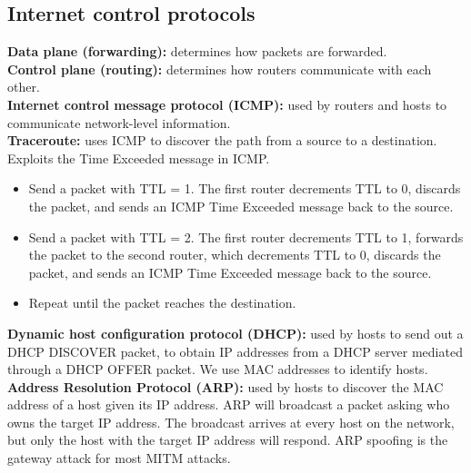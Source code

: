 \subsection{Internet control protocols}
\textbf{Data plane (forwarding):} determines how packets are forwarded.\\
\textbf{Control plane (routing):} determines how routers communicate with each other.\\
\textbf{Internet control message protocol (ICMP):} used by routers and hosts to communicate network-level information.\\
\textbf{Traceroute:} uses ICMP to discover the path from a source to a destination. Exploits the Time Exceeded message in ICMP.\\
\begin{itemize}
    \item Send a packet with TTL = 1. The first router decrements TTL to 0, discards the packet, and sends an ICMP Time Exceeded message back to the source.
    \item Send a packet with TTL = 2. The first router decrements TTL to 1, forwards the packet to the second router, which decrements TTL to 0, discards the packet, and sends an ICMP Time Exceeded message back to the source.
    \item Repeat until the packet reaches the destination.
\end{itemize}

\textbf{Dynamic host configuration protocol (DHCP):} used by hosts to send out a DHCP DISCOVER packet, to obtain IP addresses from a DHCP server mediated through a DHCP OFFER packet. We use MAC addresses to identify hosts.\\

\textbf{Address Resolution Protocol (ARP):} used by hosts to discover the MAC address of a host given its IP address. ARP will broadcast a packet asking who owns the target IP address. The broadcast arrives at every host on the network, but only the host with the target IP address will respond. ARP spoofing is the gateway attack for most MITM attacks.\\
